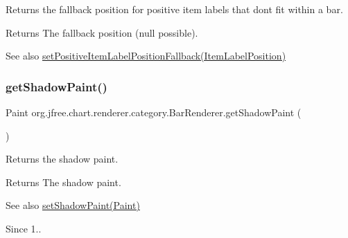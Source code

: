 Returns the fallback position for positive item labels that don\textquotesingle{}t fit within a bar.

\begin{DoxyReturn}{Returns}
The fallback position ({\ttfamily null} possible).
\end{DoxyReturn}
\begin{DoxySeeAlso}{See also}
\mbox{\hyperlink{classorg_1_1jfree_1_1chart_1_1renderer_1_1category_1_1_bar_renderer_a2e03b899d718a6329c5ca2096704c937}{set\+Positive\+Item\+Label\+Position\+Fallback(\+Item\+Label\+Position)}} 
\end{DoxySeeAlso}
\mbox{\label{classorg_1_1jfree_1_1chart_1_1renderer_1_1category_1_1_bar_renderer_adf1357a6926c8a92fa990e486e68913e}} 
\subsubsection{\texorpdfstring{get\+Shadow\+Paint()}{getShadowPaint()}}
{\footnotesize\ttfamily Paint org.\+jfree.\+chart.\+renderer.\+category.\+Bar\+Renderer.\+get\+Shadow\+Paint (\begin{DoxyParamCaption}{ }\end{DoxyParamCaption})}

Returns the shadow paint.

\begin{DoxyReturn}{Returns}
The shadow paint.
\end{DoxyReturn}
\begin{DoxySeeAlso}{See also}
\mbox{\hyperlink{classorg_1_1jfree_1_1chart_1_1renderer_1_1category_1_1_bar_renderer_a374cb539bacc8cfffc407bae73a38d6d}{set\+Shadow\+Paint(\+Paint)}}
\end{DoxySeeAlso}
\begin{DoxySince}{Since}
1.. 
\end{DoxySince}
\mbox{\label{classorg_1_1jfree_1_1chart_1_1renderer_1_1category_1_1_bar_renderer_ad8187f4f86eac0cb615f782edc2d6f05}} 
